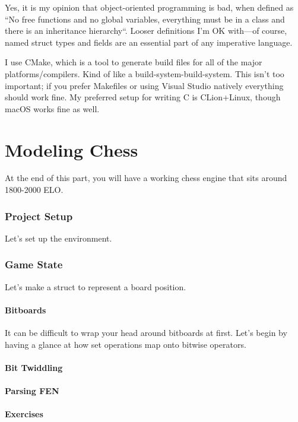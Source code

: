 \documentclass[letterpaper,11pt]{article}
\begin{document}
Yes, it is my opinion that object-oriented programming is bad, when defined as 
``No free functions and no global variables, everything must be in a class and there is an inheritance hierarchy``.
Looser definitions I'm OK with---of course, 
named struct types and fields are an essential part of any imperative language. 

I use CMake, which is a tool to generate build files for all of the major platforms/compilers. 
Kind of like a build-system-build-system. This isn't too important; if you prefer Makefiles or 
using Visual Studio natively everything should work fine. 
My preferred setup for writing C is CLion+Linux, though macOS works fine as well. 

\newpage
\part{Modeling Chess}

At the end of this part, you will have a working chess engine that sits around 1800-2000 ELO. 

\section{Project Setup}

Let's set up the environment.

\section{Game State}

Let's make a struct to represent a board position.

\subsection{Bitboards}

It can be difficult to wrap your head around bitboards at first. Let's begin by having a glance at 
how set operations map onto bitwise operators.

\subsection{Bit Twiddling}
\subsection{Parsing FEN}
\subsection{Exercises}
\end{document}
